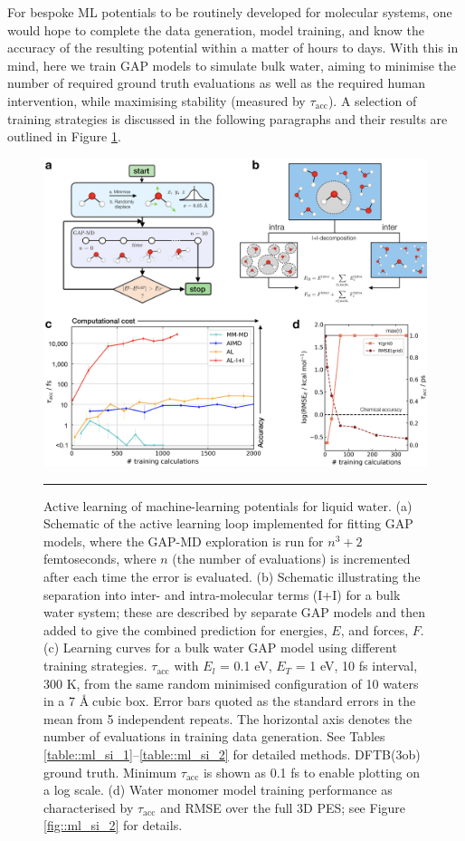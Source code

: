 \documentclass[../../main.tex]{subfiles}
\newcommand{\taua}{$\tau_\text{acc}$ }
\newcommand{\tauns}{$\tau_\text{acc}$}
\begin{document}
For bespoke ML potentials to be routinely developed for molecular systems, one would hope to complete the data generation, model training, and know the accuracy of the resulting potential within a matter of hours to days. With this in mind, here we train GAP models to simulate bulk water, aiming to minimise the number of required ground truth evaluations as well as the required human intervention, while maximising stability (measured by \tauns). A selection of training strategies is discussed in the following paragraphs and their results are outlined in Figure \ref{fig::ml_1}. 


\begin{figure}[p]
	\vspace{0.4cm}
	\centering
	\includegraphics[width=\textwidth]{6/gap/figs_ms/fig1}
	\vspace{0.2cm}
	\hrule
	\caption{Active learning of machine-learning potentials for liquid water. (a) Schematic of the active learning loop implemented for fitting GAP models, where the GAP-MD exploration is run for $n^3 +2$ femtoseconds, where $n$ (the number of evaluations) is incremented after each time the error is evaluated. (b) Schematic illustrating the separation into inter- and intra-molecular terms (I+I) for a bulk water system; these are described by separate GAP models and then added to give the combined prediction for energies, $E$, and forces, $F$. (c) Learning curves for a bulk water GAP model using different training strategies. \taua with $E_l$ = 0.1 eV, $E_T$ = 1 eV, 10 fs interval, 300 K, from the same random minimised configuration of 10 waters in a 7 \AA$\;$cubic box. Error bars quoted as the standard errors in the mean from 5 independent repeats. The horizontal axis denotes the number of evaluations in training data generation. See Tables \ref{table::ml_si_1}--\ref{table::ml_si_2} for detailed methods. DFTB(3ob) ground truth. Minimum \taua is shown as 0.1 fs to enable plotting on a log scale. (d) Water monomer model training performance as characterised by \taua and RMSE over the full 3D PES; see Figure \ref{fig::ml_si_2} for details.}
	\label{fig::ml_1}
\end{figure}
\end{document}
